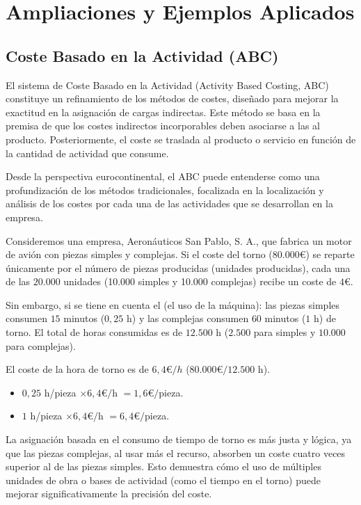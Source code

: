 \section{Ampliaciones y Ejemplos Aplicados}

\subsection{Coste Basado en la Actividad (ABC)}

El sistema de Coste Basado en la Actividad (Activity Based Costing, ABC) constituye un refinamiento de los métodos de costes, diseñado para mejorar la exactitud en la asignación de cargas indirectas. Este método se basa en la premisa de que los costes indirectos incorporables deben asociarse a las  al producto. Posteriormente, el coste se traslada al producto o servicio en función de la cantidad de actividad que consume.

Desde la perspectiva eurocontinental, el ABC puede entenderse como una profundización de los métodos tradicionales, focalizada en la localización y análisis de los costes por cada una de las actividades que se desarrollan en la empresa.

\begin{ejemplo}
Consideremos una empresa, Aeronáuticos San Pablo, S. A., que fabrica un motor de avión con piezas simples y complejas. Si el coste del torno ($80.000 €$) se reparte únicamente por el número de piezas producidas (unidades producidas), cada una de las $20.000$ unidades (10.000 simples y 10.000 complejas) recibe un coste de $4 €$.

Sin embargo, si se tiene en cuenta el  (el uso de la máquina): las piezas simples consumen $15$ minutos ($0,25$ h) y las complejas consumen $60$ minutos ($1$ h) de torno. El total de horas consumidas es de $12.500$ h ($2.500$ para simples y $10.000$ para complejas).

El coste de la hora de torno es de $6,4 €/h$ ($80.000 € / 12.500$ h).

\begin{itemize}
    \item {} $0,25$ h/pieza $\times 6,4 €/$h $= 1,6 €/$pieza.
    \item {} $1$ h/pieza $\times 6,4 €/$h $= 6,4 €/$pieza.
\end{itemize}
La asignación basada en el consumo de tiempo de torno es más justa y lógica, ya que las piezas complejas, al usar más el recurso, absorben un coste cuatro veces superior al de las piezas simples. Esto demuestra cómo el uso de múltiples unidades de obra o bases de actividad (como el tiempo en el torno) puede mejorar significativamente la precisión del coste.
\end{ejemplo}

